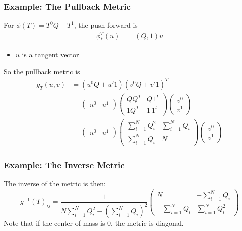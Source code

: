 \documentclass[10pt]{article}
\begin{document}
\subsubsection*{Example: The Pullback Metric}
For $\phi(T) = T^0Q + T^1$, the push forward is
\begin{align*}
    \phi_*^T(u) &= (Q, 1)u
\end{align*}
\begin{itemize}
	\item $u$ is a tangent vector
\end{itemize}
So the pullback metric is
\begin{align*}
    g_T(u, v) &= (u^0 Q + u' 1)(v^0 Q + v' 1)^T\\
    &= \begin{pmatrix} u^0 & u^1 \end{pmatrix} \begin{pmatrix} QQ^T & Q 1^T \\ 1 Q^T & 1 \:1^t \end{pmatrix} \begin{pmatrix} v^0 \\ v^1 \end{pmatrix}\\
    &= \begin{pmatrix} u^0 & u^1 \end{pmatrix} \begin{pmatrix} \sum_{i = 1}^N Q_i^2 & \sum_{i = 1}^N Q_i \\ \sum_{i = 1}^N Q_i & N \end{pmatrix} \begin{pmatrix} v^0 \\ v^1 \end{pmatrix}
\end{align*}

\subsubsection*{Example: The Inverse Metric}
The inverse of the metric is then:
\[g^{-1}(T)_{ij} = \frac{1}{N \sum_{i = 1}^N Q_i^2 - \left(\sum_{i = 1}^N Q_i\right)^2} \begin{pmatrix} N & -\sum_{i = 1}^N Q_i \\ -\sum_{i = 1}^N Q_i & \sum_{i = 1}^N Q_i^2 \end{pmatrix}\]
Note that if the center of mass is 0, the metric is diagonal.
\end{document}
